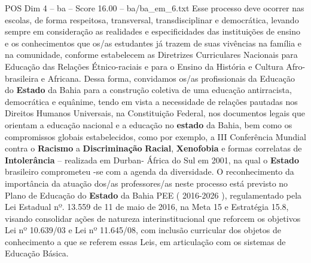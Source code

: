\begin{textsample}{POS Dim 4 – ba – Score 16.00 – ba/ba\_em\_6.txt}
Esse processo deve ocorrer nas escolas, de forma respeitosa, transversal, transdisciplinar e democrática, levando sempre em consideração as realidades e especificidades das instituições de ensino e os conhecimentos que os/as estudantes já trazem de suas vivências na família e na comunidade, conforme estabelecem as Diretrizes Curriculares Nacionais para Educação das Relações Étnico-raciais e para o Ensino da História e Cultura Afro-brasileira e Africana.
Dessa forma, convidamos os/as profissionais da Educação do \textbf{Estado} da Bahia para a construção coletiva de uma educação antirracista, democrática e equânime, tendo em vista a necessidade de relações pautadas nos Direitos Humanos Universais, na Constituição Federal, nos documentos legais que orientam a educação nacional e a educação no \textbf{estado} da Bahia, bem como os compromissos globais estabelecidos, como por exemplo, a III Conferência Mundial contra o \textbf{Racismo} a \textbf{Discriminação} \textbf{Racial}, \textbf{Xenofobia} e formas correlatas de \textbf{Intolerância} – realizada em Durban- África do Sul em 2001, na qual o \textbf{Estado} brasileiro comprometeu -se com a agenda da diversidade.
O reconhecimento da importância da atuação dos/as professores/as neste processo está previsto no Plano de Educação do \textbf{Estado} da Bahia PEE ( 2016-2026 ), regulamentado pela Lei Estadual nº. 13.559 de 11 de maio de 2016, na Meta 15 e Estratégia 15.8, visando consolidar ações de natureza interinstitucional que reforcem os objetivos Lei nº 10.639/03 e Lei nº 11.645/08, com inclusão curricular dos objetos de conhecimento a que se referem essas Leis, em articulação com os sistemas de Educação Básica.

\end{textsample}
